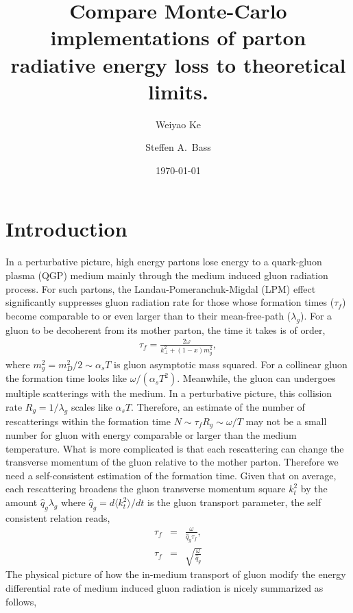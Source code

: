 \documentclass[aps, prc, reprint, amsmath, groupedaddress, nofootinbib]{revtex4-1}
\begin{document}
\title{Compare Monte-Carlo implementations of parton radiative energy loss to theoretical limits.}
\author{Weiyao Ke}
\author{Steffen A.\ Bass}
\date{\today}
\maketitle

\section{Introduction}
In a perturbative picture, high energy partons lose energy to a quark-gluon plasma (QGP) medium mainly through the medium induced gluon radiation process.
For such partons, the Landau-Pomeranchuk-Migdal (LPM) effect significantly suppresses gluon radiation rate for those whose formation times ($\tau_f$) become comparable to or even larger than to their mean-free-path ($\lambda_g$).
For a gluon to be decoherent from its mother parton, the time it takes is of order,
\begin{eqnarray}
\tau_f = \frac{2\omega}{k_\perp^2+(1-x)m_g^2},
\end{eqnarray}
where $m_g^2=m_D^2/2 \sim \alpha_s T$ is gluon asymptotic mass squared.
For a collinear gluon the formation time looks like $\omega/(\alpha_s T^2)$.
Meanwhile, the gluon can undergoes multiple scatterings with the medium.
In a perturbative picture, this collision rate $R_{g} = 1/\lambda_g$ scales like $\alpha_s T$. 
Therefore, an estimate of the number of rescatterings within the formation time $N \sim \tau_f R_g \sim \omega/T$ may not be a small number for gluon with energy comparable or larger than the medium temperature.
What is more complicated is that each rescattering can change the transverse momentum of the gluon relative to the mother parton.
Therefore we need a self-consistent estimation of the formation time.
Given that on average, each rescattering broadens the gluon transverse momentum square $k_t^2$ by the amount $\hat{q}_g\lambda_g$ where $\hat{q}_g = d\langle k_t^2\rangle/dt$ is the gluon transport parameter, the self consistent relation reads,
\begin{eqnarray}
\tau_f &=& \frac{\omega}{\hat{q}_g\tau_f},\\
\tau_f &=& \sqrt{\frac{\omega}{\hat{q}_g}}
\end{eqnarray}
The physical picture of how the in-medium transport of gluon modify the energy differential rate of medium induced gluon radiation is nicely summarized as follows,
\end{document}

